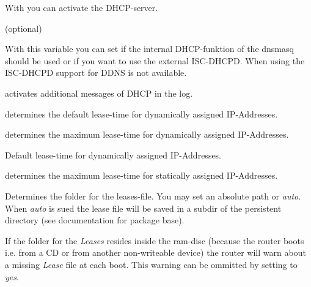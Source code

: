  \begin{description}


    {With  you can activate the DHCP-server.}

     (optional)

    {With this variable you can set if the internal DHCP-funktion of the
    dnsmasq should be used or if you want to use the external ISC-DHCPD.
    When using the ISC-DHCPD support for DDNS is not available.}


    {activates additional messages of DHCP in the log.}


    {determines the default lease-time for dynamically assigned IP-Addresses.}


    {determines the maximum lease-time for dynamically assigned IP-Addresses.}


    {Default lease-time for dynamically assigned IP-Addresses.}


    {determines the maximum lease-time for statically assigned IP-Addresses.}


    {Determines the folder for the leases-file. You may set an absolute path
    or \emph{auto}. When \emph{auto} is sued the lease file will be saved in a subdir
    of the persistent directory (see documentation for package base).}


    {If the folder for the \emph{Leases} resides inside the ram-disc (because the router boots
    i.e. from a CD or from another non-writeable device) the router will warn about
    a missing \emph{Lease} file at each boot. This warning can be ommitted by setting
     to \emph{yes}.}


\end{description}
